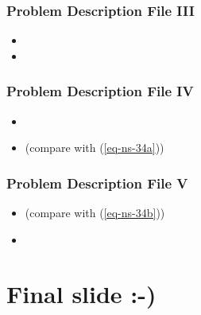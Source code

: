 \documentclass[10pt,t]{beamer}
\newcommand{\blue}[1]{{\color{blue}{#1}}}
\newcommand{\lblue}[1]{{\color{lblue}{#1}}}
\begin{document}
\begin{frame}
  \frametitle{Problem Description File III}
  \begin{itemize}
  \item<1-> \blue{fields} \verbfields
  \item<2-> \lblue{variables} \verbvariables
  \end{itemize}
\end{frame}

\begin{frame}
  \frametitle{Problem Description File IV}
  \begin{itemize}
  \item<1-> \blue{Dirichlet BC} \verbebc
  \item<2-> \lblue{state equations} (compare with (\ref{eq-ns-34a}))
    \verbequations
  \end{itemize}
\end{frame}

\begin{frame}
  \frametitle{Problem Description File V}
  \begin{itemize}
  \item<1-> \blue{adjoint equations} (compare with (\ref{eq-ns-34b}))
    \verbequationsadjoint
  \item<2-> \lblue{materials} \verbmaterials
  \end{itemize}
\end{frame}

\section{Final slide :-)}

\subsection*{}
\end{document}
